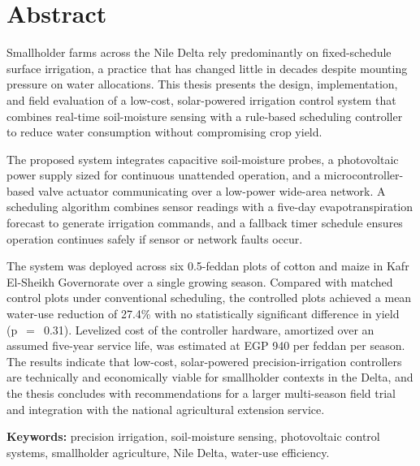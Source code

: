\chapter*{Abstract}

\begin{tcolorbox}[keybox=Thesis Abstract]
Smallholder farms across the Nile Delta rely predominantly on fixed-schedule surface
irrigation, a practice that has changed little in decades despite mounting pressure on water
allocations. This thesis presents the design, implementation, and field evaluation of a
low-cost, solar-powered irrigation control system that combines real-time soil-moisture
sensing with a rule-based scheduling controller to reduce water consumption without
compromising crop yield.

The proposed system integrates capacitive soil-moisture probes, a photovoltaic power supply
sized for continuous unattended operation, and a microcontroller-based valve actuator
communicating over a low-power wide-area network. A scheduling algorithm combines sensor
readings with a five-day evapotranspiration forecast to generate irrigation commands, and a
fallback timer schedule ensures operation continues safely if sensor or network faults occur.

The system was deployed across six 0.5-feddan plots of cotton and maize in Kafr El-Sheikh
Governorate over a single growing season. Compared with matched control plots under
conventional scheduling, the controlled plots achieved a mean water-use reduction of
27.4\% with no statistically significant difference in yield (p~$=$~0.31). Levelized cost
of the controller hardware, amortized over an assumed five-year service life, was
estimated at EGP 940 per feddan per season. The results indicate that low-cost,
solar-powered precision-irrigation controllers are technically and economically viable for
smallholder contexts in the Delta, and the thesis concludes with recommendations for a
larger multi-season field trial and integration with the national agricultural extension
service.

\vspace{4pt}
\textbf{Keywords:} precision irrigation, soil-moisture sensing, photovoltaic control systems,
smallholder agriculture, Nile Delta, water-use efficiency.
\end{tcolorbox}

\newpage
\thispagestyle{plain}
